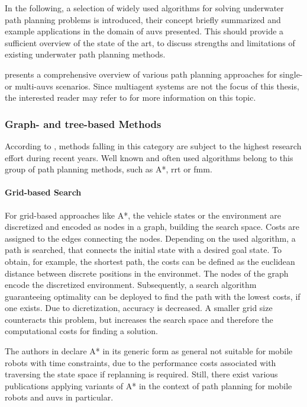 In the following, a selection of widely used algorithms for solving underwater path planning problems is introduced, their concept briefly summarized and example applications in the domain of \acp{auv} presented. This should provide a sufficient overview of the state of the art, to discuss strengths and limitations of existing underwater path planning methods.

\cite{Panda20} presents a comprehensive overview of various path planning approaches for single- or multi-\acsp{auv} scenarios. Since multiagent systems are not the focus of this thesis, the interested reader may refer to \cite{Panda20} for more information on this topic.


\subsubsection{Graph- and tree-based Methods}
According to \cite{Gomez15}, methods falling in this category are subject to the highest research effort during recent years. Well known and often used algorithms belong to this group of path planning methods, such as A*, \ac{rrt} or \ac{fmm}.


\paragraph{Grid-based Search}
For grid-based approaches like A*, the vehicle states or the environment are discretized and encoded as nodes in a graph, building the search space. Costs are assigned to the edges connecting the nodes. Depending on the used algorithm, a path is searched, that connects the initial state with a desired goal state.
To obtain, for example, the shortest path, the costs can be defined as the euclidean distance between discrete positions in the environmet. The  nodes of the graph encode the discretized environment.
Subsequently, a search algorithm guaranteeing optimality can be deployed to find the path with the lowest costs, if one exists. Due to dicretization, accuracy is decreased. A smaller grid size counteracts this problem, but increases the search space and therefore the computational costs for finding a solution.

The authors in \cite{Fernandes2015TowardsAO} declare A* in its generic form as general not suitable for mobile robots with time constraints, due to the performance costs associated with traversing the state space if replanning is required. Still, there exist various publications applying variants of A* in the context of path planning for mobile robots and \acp{auv} in particular.

